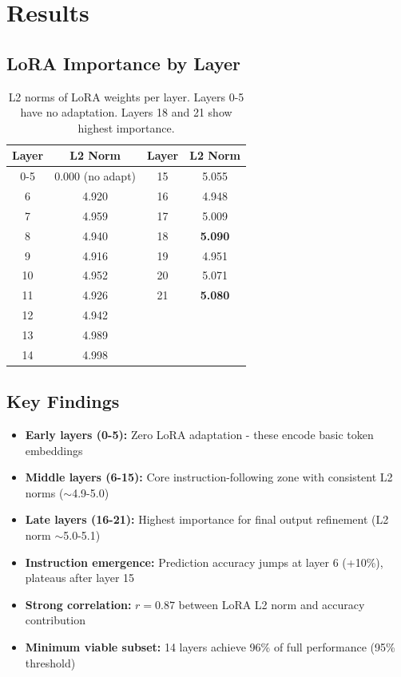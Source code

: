 \documentclass[11pt,a4paper]{article}
\begin{document}
\section*{Results}

\subsection*{LoRA Importance by Layer}
\begin{table}[H]
\centering
\small
\begin{tabular}{@{}cc|cc@{}}
\toprule
\textbf{Layer} & \textbf{L2 Norm} & \textbf{Layer} & \textbf{L2 Norm} \\
\midrule
0-5  & 0.000 (no adapt) & 15 & 5.055 \\
6  & 4.920 & 16 & 4.948 \\
7  & 4.959 & 17 & 5.009 \\
8  & 4.940 & 18 & \textbf{5.090} \\
9  & 4.916 & 19 & 4.951 \\
10 & 4.952 & 20 & 5.071 \\
11 & 4.926 & 21 & \textbf{5.080} \\
12 & 4.942 & \multicolumn{2}{c}{} \\
13 & 4.989 & \multicolumn{2}{c}{} \\
14 & 4.998 & \multicolumn{2}{c}{} \\
\bottomrule
\end{tabular}
\caption{L2 norms of LoRA weights per layer. Layers 0-5 have no adaptation. Layers 18 and 21 show highest importance.}
\end{table}

\subsection*{Key Findings}
\begin{itemize}
    \item \textbf{Early layers (0-5):} Zero LoRA adaptation - these encode basic token embeddings
    \item \textbf{Middle layers (6-15):} Core instruction-following zone with consistent L2 norms ($\sim$4.9-5.0)
    \item \textbf{Late layers (16-21):} Highest importance for final output refinement (L2 norm $\sim$5.0-5.1)
    \item \textbf{Instruction emergence:} Prediction accuracy jumps at layer 6 (+10\%), plateaus after layer 15
    \item \textbf{Strong correlation:} $r = 0.87$ between LoRA L2 norm and accuracy contribution
    \item \textbf{Minimum viable subset:} 14 layers achieve 96\% of full performance (95\% threshold)
\end{itemize}
\end{document}
